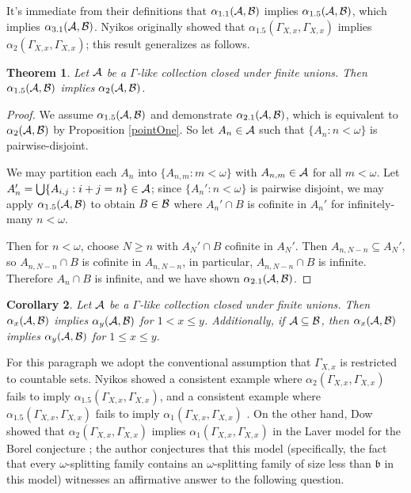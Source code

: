 \documentclass{amsart}
\theoremstyle{plain}
\newtheorem{theorem}{Theorem}
\newtheorem{corollary}[theorem]{Corollary}
\theoremstyle{definition}
\theoremstyle{remark}
\theoremstyle{plain}
\theoremstyle{definition}
\theoremstyle{remark}
\begin{document}
It's immediate from their definitions that 
\(\alpha_{1.1}(\mathcal{A},\mathcal{B})\) implies \(\alpha_{1.5}(\mathcal{A},\mathcal{B})\), which
implies \(\alpha_{3.1}(\mathcal{A},\mathcal{B})\).
Nyikos originally showed that \(\alpha_{1.5}(\Gamma_{X,x},\Gamma_{X,x})\) implies
\(\alpha_2(\Gamma_{X,x},\Gamma_{X,x})\); this result generalizes as follows.

\begin{theorem}
Let \(\mathcal{A}\) be a \(\Gamma\)-like collection closed under finite unions.
Then \(\alpha_{1.5}(\mathcal{A},\mathcal{B})\) implies
\(\alpha_{2}(\mathcal{A},\mathcal{B})\).
\end{theorem}

\begin{proof}
We assume \(\alpha_{1.5}(\mathcal{A},\mathcal{B})\) and demonstrate
\(\alpha_{2.1}(\mathcal{A},\mathcal{B})\), which is equivalent to
\(\alpha_{2}(\mathcal{A},\mathcal{B})\) by Proposition \ref{pointOne}.
So let \(A_n\in\mathcal{A}\) such that \(\{A_n:n<\omega\}\) is pairwise-disjoint.

We may partition each \(A_n\) into \(\{A_{n,m}:m<\omega\}\) with
\(A_{n,m}\in\mathcal{A}\) for all \(m<\omega\). 
Let \(A_n'=\bigcup\{A_{i,j}:i+j=n\}\in\mathcal{A}\);
since \(\{A_n':n<\omega\}\) is pairwise disjoint, we may apply
\(\alpha_{1.5}(\mathcal{A},\mathcal{B})\) to obtain \(B\in\mathcal{B}\) where
\(A_n'\cap B\) is cofinite in \(A_n'\) for infinitely-many \(n<\omega\).

Then for \(n<\omega\), choose \(N\geq n\) with \(A_N'\cap B\) cofinite in \(A_N'\).
Then \(A_{n,N-n}\subseteq A_N'\), 
so \(A_{n,N-n}\cap B\) is cofinite in \(A_{n,N-n}\), in particular,
\(A_{n,N-n}\cap B\) is infinite.
Therefore \(A_n\cap B\) is infinite, and we have shown
\(\alpha_{2.1}(\mathcal{A},\mathcal{B})\).
\end{proof}

\begin{corollary}
Let \(\mathcal{A}\) be a \(\Gamma\)-like collection closed under finite unions.
Then \(\alpha_x(\mathcal{A},\mathcal{B})\) implies \(\alpha_y(\mathcal{A},\mathcal{B})\) for
\(1<x\leq y\). Additionally, if \(\mathcal{A}\subseteq\mathcal{B}\), then 
\(\alpha_x(\mathcal{A},\mathcal{B})\) implies \(\alpha_y(\mathcal{A},\mathcal{B})\) for
\(1\leq x\leq y\).
\end{corollary}

For this paragraph we adopt the conventional assumption that
\(\Gamma_{X,x}\) is restricted to countable sets.
Nyikos showed a consistent example
where \(\alpha_2(\Gamma_{X,x},\Gamma_{X,x})\) fails to imply
\(\alpha_{1.5}(\Gamma_{X,x},\Gamma_{X,x})\), and a consistent example where
\(\alpha_{1.5}(\Gamma_{X,x},\Gamma_{X,x})\) fails to imply
\(\alpha_{1}(\Gamma_{X,x},\Gamma_{X,x})\) \cite{MR1195504}.
On the other hand, Dow showed that \(\alpha_2(\Gamma_{X,x},\Gamma_{X,x})\)
implies \(\alpha_{1}(\Gamma_{X,x},\Gamma_{X,x})\) in the Laver model
for the Borel conjecture \cite{MR975638}; the author conjectures
that this model (specifically, the fact that
every \(\omega\)-splitting family contains an \(\omega\)-splitting
family of size less than \(\mathfrak b\) in this model) witnesses
an affirmative answer to the following question.
\end{document}
